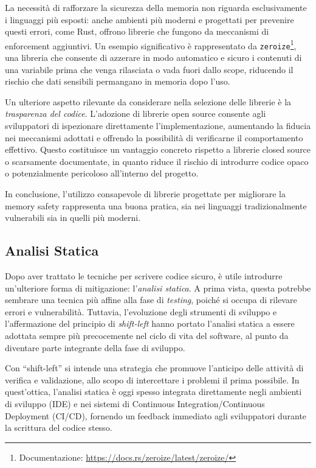 La necessità di rafforzare la sicurezza della memoria non riguarda esclusivamente
i linguaggi più esposti: anche ambienti più moderni e progettati per prevenire
questi errori, come Rust, offrono librerie che fungono da meccanismi di
enforcement aggiuntivi. Un esempio significativo è rappresentato da \texttt{zeroize}\protect\footnote{Documentazione:
\url{https://docs.rs/zeroize/latest/zeroize/}}, una libreria che consente di azzerare
in modo automatico e sicuro i contenuti di una variabile prima che venga rilasciata
o vada fuori dallo scope, riducendo il rischio che dati sensibili permangano in
memoria dopo l'uso.

Un ulteriore aspetto rilevante da considerare nella selezione delle librerie è
la \textit{trasparenza del codice}. L'adozione di librerie open source consente
agli sviluppatori di ispezionare direttamente l'implementazione, aumentando la fiducia
nei meccanismi adottati e offrendo la possibilità di verificarne il comportamento
effettivo. Questo costituisce un vantaggio concreto rispetto a librerie closed
source o scarsamente documentate, in quanto riduce il rischio di introdurre codice
opaco o potenzialmente pericoloso all'interno del progetto.

In conclusione, l'utilizzo consapevole di librerie progettate per migliorare la
memory safety rappresenta una buona pratica, sia nei linguaggi tradizionalmente vulnerabili
sia in quelli più moderni.

\subsection{Analisi Statica}
\label{sec:analisi-statica}

Dopo aver trattato le tecniche per scrivere codice sicuro, è utile introdurre un'ulteriore
forma di mitigazione: l'\textit{analisi statica}. A prima vista, questa potrebbe
sembrare una tecnica più affine alla fase di \textit{testing}, poiché si occupa di
rilevare errori e vulnerabilità. Tuttavia, l'evoluzione degli strumenti di sviluppo
e l'affermazione del principio di \textit{shift-left} hanno portato l'analisi
statica a essere adottata sempre più precocemente nel ciclo di vita del software,
al punto da diventare parte integrante della fase di sviluppo.

Con ``shift-left'' si intende una strategia che promuove l'anticipo delle attività
di verifica e validazione, allo scopo di intercettare i problemi il prima
possibile. In quest'ottica, l'analisi statica è oggi spesso integrata
direttamente negli ambienti di sviluppo (IDE) e nei sistemi di Continuous
Integration/Continuous Deployment (CI/CD), fornendo un feedback immediato agli sviluppatori
durante la scrittura del codice stesso.

